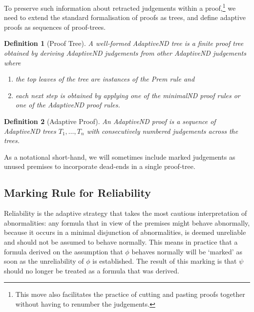 \documentclass[]{article}
\newtheorem{definition}{Definition}
\begin{document}
To preserve such information about retracted judgements within a proof,\footnote{This move also facilitates the practice of cutting and pasting proofs together without having to renumber the judgements.} we need to extend the standard formalisation of proofs as trees, and define adaptive proofs as sequences of proof-trees.

\begin{definition}[Proof Tree]
A well-formed {\sf AdaptiveND} tree is a finite proof tree obtained by deriving AdaptiveND judgements from other {\sf AdaptiveND} judgements where
\begin{enumerate}

\item the top leaves of the tree are instances of the {\sf Prem} rule and
\item each next step is obtained by applying one of the {\sf minimalND} proof rules or one of the {\sf AdaptiveND} proof rules.
\end{enumerate}
\end{definition}

\begin{definition}[Adaptive Proof]
An {\sf AdaptiveND} proof is a sequence of {\sf AdaptiveND} trees $T_{1}, \dots, T_{n}$ with consecutively numbered judgements across the trees.
\end{definition}

As a notational short-hand, we will sometimes include marked judgements as unused premises to incorporate dead-ends in a single proof-tree.


\subsection{Marking Rule for Reliability}\label{sec:markrel}

Reliability is the adaptive strategy that takes the most cautious interpretation of abnormalities: any formula that in view of the premises might behave abnormally, because it occurs in a minimal disjunction of abnormalities, is deemed unreliable and should not be assumed to behave normally. This means in practice that a formula derived on the assumption that $\phi$ behaves normally will be `marked' as soon as the unreliability of $\phi$ is established. The result of this marking is that $\psi$ should no longer be treated as a formula that was derived.

\end{document}
